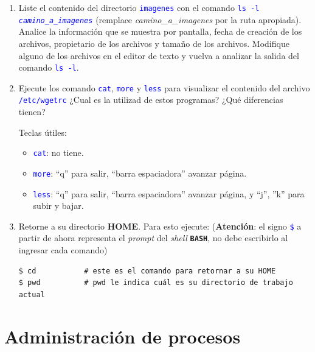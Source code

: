 \documentclass[12pt]{article}
\newcommand{\cw}[1]{\texttt{\textcolor{blue}{#1}}}
\newcommand{\bash}{\textbf{\texttt{BASH}}}
\begin{document}
\begin{enumerate}[resume]
    \item Liste el contenido del directorio \cw{imagenes} con el comando \cw{ls
        -l \emph{camino\_a\_imagenes}} (remplace \emph{camino\_a\_imagenes}
        por la ruta apropiada). Analice la información que se muestra por
        pantalla, fecha de creación de los archivos, propietario de los
        archivos y tamaño de los archivos. Modifique alguno de los archivos en
        el editor de texto y vuelva a analizar la salida del comando \cw{ls
        -l}.

    \item Ejecute los comando \cw{cat}, \cw{more} y \cw{less} para visualizar
        el contenido del archivo \cw{/etc/wgetrc} ¿Cual es la utilizad de
        estos programas? ¿Qué diferencias tienen?

    Teclas útiles:

    \begin{itemize}

        \itemsep2pt \parskip0pt 

        \item \cw{cat}: no tiene.

        \item \cw{more}: ``q'' para salir, ``barra espaciadora'' avanzar
            página.

        \item \cw{less}: ``q'' para salir, ``barra espaciadora'' avanzar
            página, y ``j'', ''k'' para subir y bajar.

    \end{itemize}

    \item Retorne a su directorio \textbf{HOME}. Para esto ejecute:
        (\textbf{Atención}: el signo \cw{\$} a partir de ahora representa el
        \emph{prompt} del \emph{shell} \bash, no debe escribirlo al ingresar
        cada comando)

        \begin{verbatim}
$ cd           # este es el comando para retornar a su HOME
$ pwd          # pwd le indica cuál es su directorio de trabajo actual
        \end{verbatim}

\end{enumerate}

\section{Administración de procesos}
\end{document}
